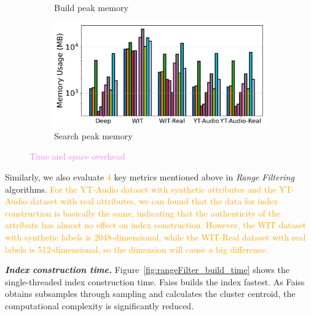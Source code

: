 \documentclass[sigconf, nonacm]{acmart}
\begin{document}
\begin{figure}[t]
\begin{subfigure}[t]{0.49\columnwidth}
			\caption{\footnotesize Build peak memory}
			\label{fig:rangeFilter_build_memory_mb}
		\end{subfigure}
		\hfill
		\begin{subfigure}[t]{0.49\columnwidth}
			\centering
			\includegraphics[width=\linewidth]{figures/searchMem/range_memory_comparison.pdf}
			\caption{\footnotesize Search peak memory}
			\label{fig:rangeFilter_search_memory_mb}
		\end{subfigure}
		
		\caption{\textcolor{violet}{Time and space overhead}}
		\label{fig:rangeFilter_build_index_comparison}
	\end{figure}
	
	Similarly, we also evaluate \textcolor{orange}{4} key metrics mentioned above in \textit{Range Filtering} algorithms. \textcolor{orange}{For the YT-Audio dataset with synthetic attributes and the YT-Audio dataset with real attributes, we can found that the data for index construction is basically the same, indicating that the authenticity of the attribute has almost no effect on index construction.
	However, the WIT dataset with synthetic labels is 2048-dimensional, while the WIT-Real dataset with real labels is 512-dimensional, so the dimension will cause a big difference.}
	
	\textit{\textbf{Index construction time.}}
	Figure~\ref{fig:rangeFilter_build_time} shows the single-threaded index construction time. Faiss builds the index fastest. As Faiss obtains subsamples through sampling and calculates the cluster centroid, the computational complexity is significantly reduced.
	
\end{document}
